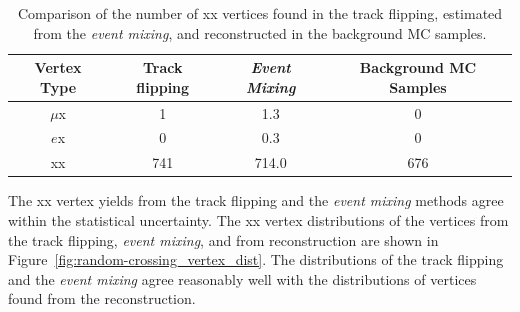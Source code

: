 \begin{table}[!htb]
  \centering
  \begin{tabular}{ c  c c c }
    \hline
    \hline
	Vertex Type					&Track flipping	&\textit{Event Mixing}	& Background MC Samples \\
    \hline
	$\mu$x						&	1						&	1.3 				&	0					\\
	$e$x						&	0						&	0.3 				&	0					\\
	xx						&	741 					&	714.0				&	676 				\\
    \hline
    \hline
  \end{tabular}
  \caption{Comparison of the number of xx vertices found in the track flipping, estimated from the \textit{event mixing}, and reconstructed in the background MC samples.}
  \label{table:random_vertex_count}
\end{table}

The xx vertex yields from the track flipping and the \textit{event mixing} methods agree within the statistical uncertainty. The xx vertex distributions of the vertices from the track flipping, \textit{event mixing}, and from reconstruction are shown in Figure~\ref{fig:random-crossing_vertex_dist}. The distributions of the track flipping and the \textit{event mixing} agree reasonably well with the distributions of vertices found from the reconstruction.


